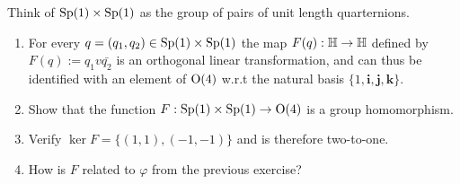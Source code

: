 \documentclass[12pt]{book}
\theoremstyle{definition}
\begin{document}
\begin{taggedexercise}[Complete]
  Think of $\mathrm{Sp}(1) \times \mathrm{Sp}(1)$ as the group of pairs of unit length quarternions.
  \begin{enumerate}
    \item For every $q = (q_1, q_2) \in \mathrm{Sp}(1) \times \mathrm{Sp}(1)$ the map $F(q): \mathbb{H} \to \mathbb{H}$ defined by $F(q) := q_1v\bar{q_2}$ is an orthogonal linear transformation, and can thus be identified with an element of $\mathrm{O}(4)$ w.r.t the natural basis $\{1, \mathbf{i}, \mathbf{j}, \mathbf{k}\}$.
    \item Show that the function $F: \mathrm{Sp}(1) \times \mathrm{Sp}(1) \to \mathrm{O}(4)$ is a group homomorphism.
    \item Verify $\ker{F} = \{(1, 1), (-1, -1)\}$ and is therefore two-to-one.
    \item How is $F$ related to $\varphi$ from the previous exercise?
  \end{enumerate}
\end{taggedexercise}
\end{document}
